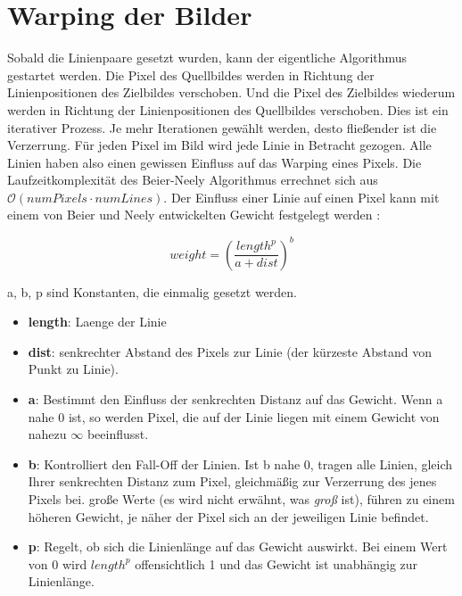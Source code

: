 \chapter{Warping der Bilder}

Sobald die Linienpaare gesetzt wurden, kann der eigentliche Algorithmus gestartet werden. Die Pixel
des Quellbildes werden in Richtung der Linienpositionen des Zielbildes verschoben. Und die Pixel
des Zielbildes wiederum werden in Richtung der Linienpositionen des Quellbildes verschoben.
Dies ist ein iterativer Prozess. Je mehr Iterationen gewählt werden, desto flie\ss ender ist
die Verzerrung.
Für jeden Pixel im Bild wird jede Linie in Betracht gezogen. Alle Linien haben also einen gewissen Einfluss auf
das Warping eines Pixels. Die Laufzeitkomplexität
des Beier-Neely Algorithmus errechnet sich aus
$\mathcal{O}(numPixels \cdot numLines)$.
Der Einfluss einer Linie auf einen Pixel kann mit einem
von Beier und Neely entwickelten Gewicht festgelegt werden
\cite{beierneely}:

\begin{equation}
	weight = \left(\frac{length^{p}}{a+dist}\right)^{b}
\end{equation}

a, b, p sind Konstanten, die einmalig gesetzt werden.

\begin{itemize}
	\item \textbf{length}: Laenge der Linie
	\item \textbf{dist}: senkrechter Abstand des Pixels zur Linie (der kürzeste Abstand
	von Punkt zu Linie).
	\item \textbf{a}: Bestimmt den Einfluss der senkrechten Distanz
	auf das Gewicht. Wenn a nahe 0 ist, so werden Pixel, die auf der
	Linie liegen mit einem Gewicht von nahezu $\infty$ beeinflusst.
	\item \textbf{b}: Kontrolliert den Fall-Off der Linien. Ist b
	nahe 0, tragen alle Linien, gleich Ihrer senkrechten Distanz zum
	Pixel, gleichmä\ss ig zur Verzerrung des jenes Pixels bei.
	gro\ss e Werte (es wird nicht erwähnt, was \emph{gro\ss} ist), führen
	zu einem höheren Gewicht, je näher der Pixel sich an
	der jeweiligen Linie befindet.
	\item \textbf{p}: Regelt, ob sich die Linienlänge auf das Gewicht
	auswirkt. Bei einem Wert von 0 wird $length^{p}$ offensichtlich 1
	und das Gewicht ist unabhängig zur Linienlänge.
\end{itemize}


